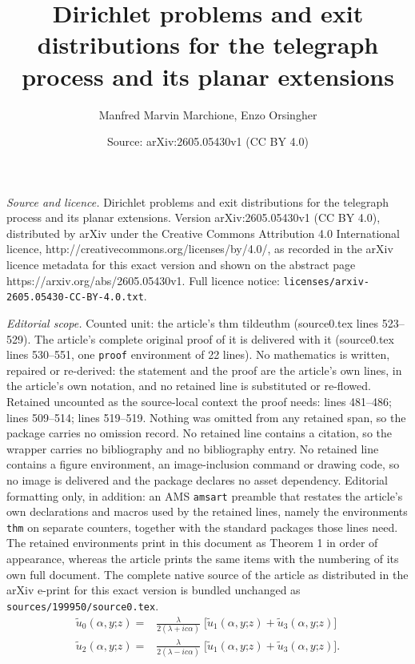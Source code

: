 \documentclass[10pt,a4paper]{amsart}
\title{Dirichlet problems and exit distributions for the telegraph process and its planar extensions}
\author{Manfred Marvin Marchione, Enzo Orsingher}
\date{Source: arXiv:2605.05430v1 (CC BY 4.0)}
\begin{document}
\maketitle

\noindent\emph{Source and licence.} Dirichlet problems and exit distributions for the telegraph process and its planar extensions. Version arXiv:2605.05430v1 (CC BY 4.0), distributed by arXiv under the Creative Commons Attribution 4.0 International licence, http://creativecommons.org/licenses/by/4.0/, as recorded in the arXiv licence metadata for this exact version and shown on the abstract page https://arxiv.org/abs/2605.05430v1. Full licence notice: \texttt{licenses/arxiv-2605.05430-CC-BY-4.0.txt}.\par\smallskip

\noindent\textit{Editorial scope.} Counted unit: the article's thm tildeuthm (source0.tex lines 523--529). The article's complete original proof of it is delivered with it (source0.tex lines 530--551, one \texttt{proof} environment of 22 lines). No mathematics is written, repaired or re-derived: the statement and the proof are the article's own lines, in the article's own notation, and no retained line is substituted or re-flowed.  Retained uncounted as the source-local context the proof needs: lines 481--486; lines 509--514; lines 519--519.  Nothing was omitted from any retained span, so the package carries no omission record.  No retained line contains a citation, so the wrapper carries no bibliography and no bibliography entry.  No retained line contains a figure environment, an image-inclusion command or drawing code, so no image is delivered and the package declares no asset dependency.  Editorial formatting only, in addition: an AMS \texttt{amsart} preamble that restates the article's own declarations and macros used by the retained lines, namely the environments \texttt{thm} on separate counters, together with the standard packages those lines need.  The retained environments print in this document as Theorem 1 in order of appearance, whereas the article prints the same items with the numbering of its own full document.  The complete native source of the article as distributed in the arXiv e-print for this exact version is bundled unchanged as \texttt{sources/199950/source0.tex}.
\begin{equation}\label{algebrain}
\begin{aligned}
\widetilde{u}_0(\alpha,y\mathord{;}z)=&\frac{\lambda}{2(\lambda+ic\alpha)}\;\big[\widetilde{u}_1(\alpha,y\mathord{;}z)+\widetilde{u}_3(\alpha,y\mathord{;}z)\big]\\
\widetilde{u}_2(\alpha,y\mathord{;}z)=&\frac{\lambda}{2(\lambda-ic\alpha)}\;\big[\widetilde{u}_1(\alpha,y\mathord{;}z)+\widetilde{u}_3(\alpha,y\mathord{;}z)\big].
\end{aligned}
\end{equation}
\end{document}
